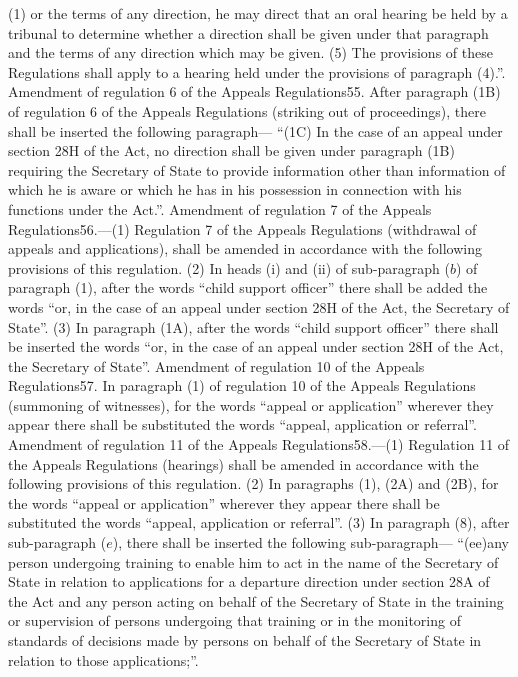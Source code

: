 \documentclass[a4paper]{article}
\begin{document}
(1) or the terms of any direction, he may direct that an oral hearing be held by
a tribunal to determine whether a direction shall be given under that paragraph
and the terms of any direction which may be given.
(5) The provisions of these Regulations shall apply to a hearing held under the
provisions of paragraph (4).”.
Amendment of regulation 6 of the Appeals Regulations55. After paragraph (1B) of
regulation 6 of the Appeals Regulations (striking out of proceedings), there
shall be inserted the following paragraph—
“(1C) In the case of an appeal under section 28H of the Act, no direction shall
be given under paragraph (1B) requiring the Secretary of State to provide
information other than information of which he is aware or which he has in his
possession in connection with his functions under the Act.”.
Amendment of regulation 7 of the Appeals Regulations56.—(1) Regulation 7 of the
Appeals Regulations (withdrawal of appeals and applications), shall be amended
in accordance with the following provisions of this regulation.
(2) In heads (i) and (ii) of sub-paragraph ($b$) of paragraph (1), after the words
“child support officer” there shall be added the words “or, in the case of an
appeal under section 28H of the Act, the Secretary of State”.
(3) In paragraph (1A), after the words “child support officer” there shall be
inserted the words “or, in the case of an appeal under section 28H of the Act,
the Secretary of State”.
Amendment of regulation 10 of the Appeals Regulations57. In paragraph (1) of
regulation 10 of the Appeals Regulations (summoning of witnesses), for the words
“appeal or application” wherever they appear there shall be substituted the
words “appeal, application or referral”.
Amendment of regulation 11 of the Appeals Regulations58.—(1) Regulation 11 of
the Appeals Regulations (hearings) shall be amended in accordance with the
following provisions of this regulation.
(2) In paragraphs (1), (2A) and (2B), for the words “appeal or application”
wherever they appear there shall be substituted the words “appeal, application
or referral”.
(3) In paragraph (8), after sub-paragraph ($e$), there shall be inserted the
following sub-paragraph—
“(ee)any person undergoing training to enable him to act in the name of the
Secretary of State in relation to applications for a departure direction under
section 28A of the Act and any person acting on behalf of the Secretary of State
in the training or supervision of persons undergoing that training or in the
monitoring of standards of decisions made by persons on behalf of the Secretary
of State in relation to those applications;”.
\end{document}
